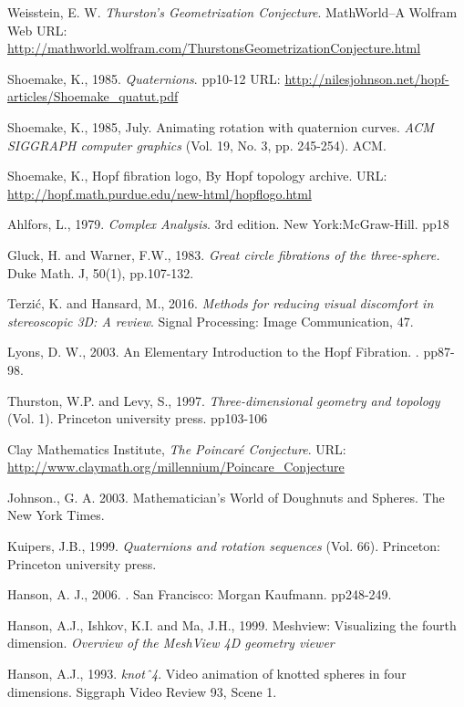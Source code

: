 \documentclass[12pt]{article} %
\begin{document}
\begin{flushleft}
\begin{thebibliography}{99}
 Weisstein, E. W. {\em Thurston's Geometrization Conjecture}. MathWorld--A Wolfram Web URL: \url{http://mathworld.wolfram.com/ThurstonsGeometrizationConjecture.html}

Shoemake, K., 1985. {\em Quaternions}. pp10-12 URL: \url{http://nilesjohnson.net/hopf-articles/Shoemake_quatut.pdf}

Shoemake, K., 1985, July. Animating rotation with quaternion curves. {\em ACM SIGGRAPH computer graphics} (Vol. 19, No. 3, pp. 245-254). ACM.

 Shoemake, K., Hopf fibration logo, By Hopf topology archive. URL: \url{http://hopf.math.purdue.edu/new-html/hopflogo.html}

Ahlfors, L., 1979. {\em Complex Analysis}. 3rd edition. New York:McGraw-Hill. pp18

Gluck, H. and Warner, F.W., 1983. {\em Great circle fibrations of the three-sphere.} Duke Math. J, 50(1), pp.107-132.

Terzić, K. and Hansard, M., 2016. {\em Methods for reducing visual discomfort in stereoscopic 3D: A review}. Signal Processing: Image Communication, 47.

Lyons, D. W., 2003.
\newblock An Elementary Introduction to the Hopf Fibration.
. pp87-98.

Thurston, W.P. and Levy, S., 1997. {\em Three-dimensional geometry and topology} (Vol. 1). Princeton university press. pp103-106

Clay Mathematics Institute, {\em The Poincaré Conjecture}.
URL: \url{http://www.claymath.org/millennium/Poincare_Conjecture}

Johnson., G. A. 2003. Mathematician's World of Doughnuts and Spheres. The New York Times.

Kuipers, J.B., 1999. {\em Quaternions and rotation sequences} (Vol. 66). Princeton: Princeton university press.

Hanson, A. J., 2006.
.
 San Francisco: Morgan Kaufmann. pp248-249.


 Hanson, A.J., Ishkov, K.I. and Ma, J.H., 1999. Meshview: Visualizing the fourth dimension. {\em Overview of the MeshView 4D geometry viewer}

Hanson, A.J., 1993. 
{\em knotˆ4}. Video animation of knotted
spheres in four dimensions. Siggraph Video Review 93, Scene 1.


\end{thebibliography}
\end{flushleft}
\end{document}

